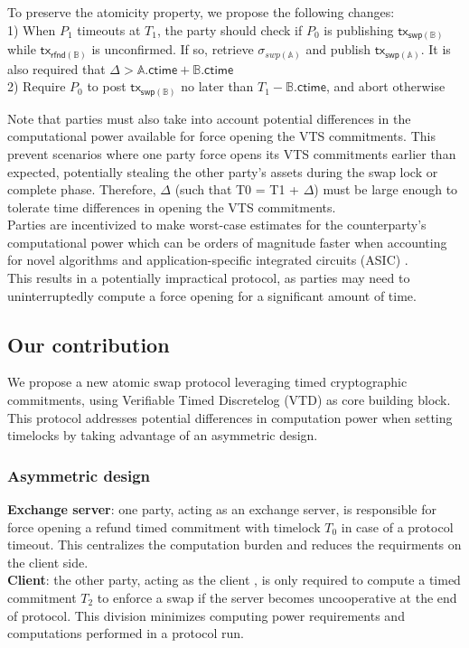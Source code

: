 \documentclass{article}      	%
\begin{document}
To preserve the atomicity property, we propose the following changes: \\
1) When $P_1$ timeouts at $T_1$, the party should check if $P_0$ is publishing $\mathsf{tx_{swp(\mathbb{B})}}$ while $\mathsf{tx_{rfnd(\mathbb{B})}}$ is unconfirmed. If so, retrieve $\sigma_{swp(\mathbb{A})}$ and publish $\mathsf{tx_{swp(\mathbb{A})}}$. It is also required that $\Delta > \mathbb{A}.\mathsf{ctime} + \mathbb{B}.\mathsf{ctime}$ \\
2) Require $P_0$ to post $\mathsf{tx_{swp(\mathbb{B})}}$ no later than $T_1 - \mathbb{B}.\mathsf{ctime}$, and abort otherwise 

Note that parties must also take into account potential differences in the computational power available for force opening the VTS commitments. This prevent scenarios where one party force opens its VTS commitments earlier than expected, potentially stealing 
 the other party's assets during the swap lock or complete phase. Therefore,  $\Delta$ (such that T0 = T1 + $\Delta$) must be large enough to tolerate time differences in opening the VTS commitments. \\

Parties are incentivized to make worst-case estimates for the counterparty's computational power which can be orders of magnitude faster when accounting for novel algorithms \cite{squaring_algo} and application-specific integrated circuits (ASIC) \cite{squaring_asic}. \\
This results in a potentially impractical protocol, as parties may need to uninterruptedly compute a force opening for a significant amount of time.

\subsection{Our contribution}

We propose a new atomic swap protocol leveraging timed cryptographic commitments, using  Verifiable Timed Discretelog (VTD) as core building block. This protocol addresses potential differences in computation power when setting timelocks by taking advantage of an asymmetric design. \\

\subsubsection*{Asymmetric design}
\textbf{Exchange server}: one party, acting as an exchange server, is responsible for force opening a refund timed commitment with timelock $T_0$ in case of a protocol timeout. This centralizes the computation burden and reduces the requirments on the client side. \\
\textbf{Client}: the other party, acting as the client , is only required to compute a timed commitment $T_2$ to enforce a swap if the server becomes uncooperative at the end of protocol. This division minimizes computing power requirements and computations performed in a protocol run.
\end{document}
